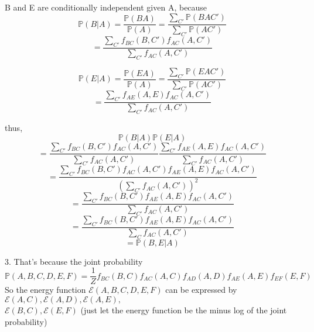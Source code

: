 \documentclass[a4 paper,12pt]{article}
\begin{document}
B and E are conditionally independent given A, because
\[ \mathbb{P}(B|A) = \frac{\mathbb{P}(BA)}{\mathbb{P}(A)} = \frac{\sum_{C'}\mathbb{P}(BAC')}{\sum_{C'}\mathbb{P}(AC')}\]
\[ = \frac{\sum_{C'}f_{BC}(B,C')f_{AC}(A,C')}{\sum_{C'}f_{AC}(A,C')}\]

\[ \mathbb{P}(E|A) = \frac{\mathbb{P}(EA)}{\mathbb{P}(A)} = \frac{\sum_{C'}\mathbb{P}(EAC')}{\sum_{C'}\mathbb{P}(AC')}\]
\[ = \frac{\sum_{C'}f_{AE}(A,E)f_{AC}(A,C')}{\sum_{C'}f_{AC}(A,C')}\]

thus, 
\[ \mathbb{P}(B|A) \mathbb{P}(E|A) \]
\[ = \frac{\sum_{C'}f_{BC}(B,C')f_{AC}(A,C')}{\sum_{C'}f_{AC}(A,C')} \frac{\sum_{C'}f_{AE}(A,E)f_{AC}(A,C')}{\sum_{C'}f_{AC}(A,C')} \]
\[ = \frac{\sum_{C'}f_{BC}(B,C')f_{AC}(A,C')f_{AE}(A,E)f_{AC}(A,C')}{(\sum_{C'}f_{AC}(A,C'))^2} \]
\[ = \frac{\sum_{C'}f_{BC}(B,C')f_{AE}(A,E)f_{AC}(A,C')}{\sum_{C'}f_{AC}(A,C')} \]
\[ = \frac{\sum_{C'}f_{BC}(B,C')f_{AE}(A,E)f_{AC}(A,C')}{\sum_{C}f_{AC}(A,C')} \]
\[ = \mathbb{P}(B,E|A) \]

3.
That's because the joint probability
\[ \mathbb{P}(A,B,C,D,E,F) = \frac{1}{Z} f_{BC}(B,C)f_{AC}(A,C)f_{AD}(A,D)f_{AE}(A,E)f_{EF}(E,F) \]
So the energy function $\mathcal{E}(A,B,C,D,E,F)$ can be expressed
by $\mathcal{E}(A,C), \mathcal{E}(A,D), \mathcal{E}(A,E),$\\$ \mathcal{E}(B,C), \mathcal{E}(E,F)$ 
(just let the energy function be the minus log of the joint probability)
\end{document}

